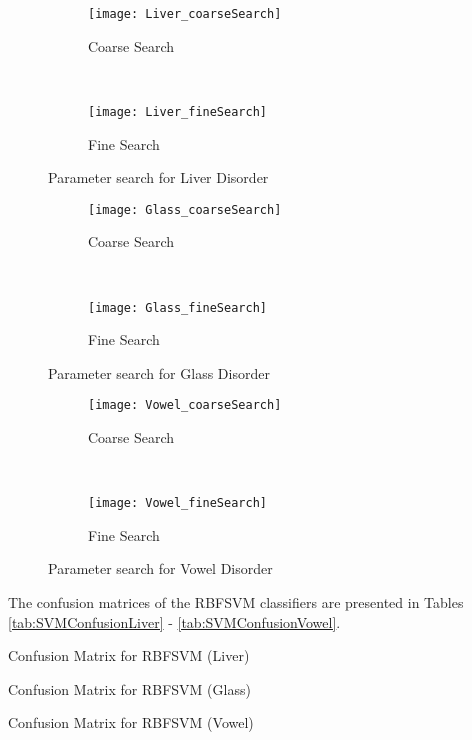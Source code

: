 \begin{figure*}[!ht]
	\centering
	\begin{subfigure}[b]{0.43\textwidth}
		\centering
		\texttt{[image: Liver\_coarseSearch]}
        \caption{Coarse Search}
	\end{subfigure}%
	~
	\begin{subfigure}[b]{0.43\textwidth}
		\centering
		\texttt{[image: Liver\_fineSearch]}
        \caption{Fine Search}
	\end{subfigure}	
	\caption{Parameter search for Liver Disorder}
	\label{fig:ParamLiver}

	\begin{subfigure}[b]{0.43\textwidth}
		\centering
		\texttt{[image: Glass\_coarseSearch]}
        \caption{Coarse Search}
	\end{subfigure}%
	~
	\begin{subfigure}[b]{0.43\textwidth}
		\centering
		\texttt{[image: Glass\_fineSearch]}
        \caption{Fine Search}
	\end{subfigure}	
	\caption{Parameter search for Glass Disorder}
	\label{fig:ParamGlass}

	\begin{subfigure}[b]{0.43\textwidth}
		\centering
		\texttt{[image: Vowel\_coarseSearch]}
        \caption{Coarse Search}
	\end{subfigure}%
	~
	\begin{subfigure}[b]{0.43\textwidth}
		\centering
		\texttt{[image: Vowel\_fineSearch]}
        \caption{Fine Search}
	\end{subfigure}	
	\caption{Parameter search for Vowel Disorder}
	\label{fig:ParamVowel}
\end{figure*}

The confusion matrices of the RBFSVM classifiers are presented in Tables \ref{tab:SVMConfusionLiver} - \ref{tab:SVMConfusionVowel}.  
\begin{table}[h!]
\caption{Confusion Matrix for RBFSVM (Liver)}
\label{tab:SVMConfusionLiver}
\centering

\end{table}
\begin{table}[h!]
\caption{Confusion Matrix for RBFSVM (Glass)}
\label{tab:SVMConfusionGlass}
\centering

\end{table}
\begin{table}[h!]
\caption{Confusion Matrix for RBFSVM (Vowel)}
\label{tab:SVMConfusionVowel}
\centering

\end{table}

